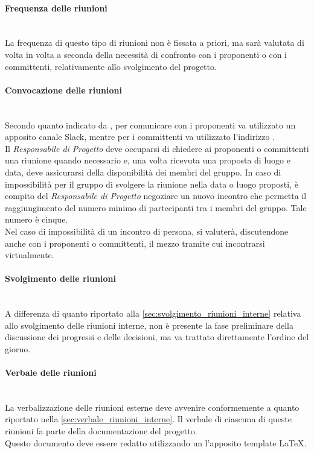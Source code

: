 \paragraph{Frequenza delle riunioni}\mbox{}\\
La frequenza di questo tipo di riunioni non è fissata a priori, ma sarà valutata di volta in volta a seconda della necessità di confronto con i proponenti o con i committenti, relativamente allo svolgimento del progetto.

\paragraph{Convocazione delle riunioni}\mbox{}\\
Secondo quanto indicato da \Proponente\texttrademark, per comunicare con i proponenti va utilizzato un apposito canale Slack\texttrademark, mentre per i committenti va utilizzato l'indirizzo \email\space \href{mailto:\GroupEmail}{\GroupEmail}.\\
Il \textit{Responsabile di Progetto} deve occuparsi di chiedere ai proponenti o committenti una riunione quando necessario e, una volta ricevuta una proposta di luogo e data, deve assicurarsi della disponibilità dei membri del gruppo. In caso di impossibilità per il gruppo di svolgere la riunione nella data o luogo proposti, è compito del \textit{Responsabile di Progetto} negoziare un nuovo incontro che permetta il raggiungimento del numero minimo di partecipanti tra i membri del gruppo. Tale numero è cinque.\\
Nel caso di impossibilità di un incontro di persona, si valuterà, discutendone anche con i proponenti o committenti, il mezzo tramite cui incontrarsi virtualmente.

\paragraph{Svolgimento delle riunioni}\mbox{}\\
A differenza di quanto riportato alla \sezione \ref{sec:svolgimento_riunioni_interne} relativa allo svolgimento delle riunioni interne, non è presente la fase preliminare della discussione dei progressi e delle decisioni, ma va trattato direttamente l'ordine del giorno.

\paragraph{Verbale delle riunioni}\mbox{}\\
La verbalizzazione delle riunioni esterne deve avvenire conformemente a quanto riportato nella \sezione \ref{sec:verbale_riunioni_interne}. Il verbale di ciascuna di queste riunioni fa parte della documentazione del progetto.\\
Questo documento deve essere redatto utilizzando un l'apposito template \LaTeX.

